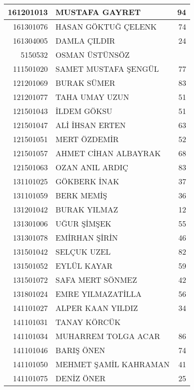 \documentclass[12pt]{article}
\begin{document}
\begin{longtable}{||r||l||r||}
    \midrule
    161201013 & MUSTAFA GAYRET & 94 \\
    \midrule
    161301076 & HASAN GÖKTUĞ ÇELENK & \cellcolor[rgb]{ 1,  1,  0} 74 \\
    \midrule
    161304005 & DAMLA ÇILDIR & 24 \\
    \midrule
    5150532 & OSMAN ÜSTÜNSÖZ &  \\
    \midrule
    111501020 & SAMET MUSTAFA ŞENGÜL & \cellcolor[rgb]{ 1,  1,  0} 77 \\
    \midrule
    121201069 & BURAK SÜMER & 83 \\
    \midrule
    121201077 & TAHA UMAY UZUN & 51 \\
    \midrule
    121501043 & İLDEM GÖKSU & 51 \\
    \midrule
    121501047 & ALİ İHSAN ERTEN & 63 \\
    \midrule
    121501051 & MERT ÖZDEMİR & 52 \\
    \midrule
    121501057 & AHMET CİHAN ALBAYRAK & \cellcolor[rgb]{ 1,  1,  0} 68 \\
    \midrule
    121501063 & OZAN ANIL ARDIÇ & \cellcolor[rgb]{ 1,  1,  0} 83 \\
    \midrule
    131101025 & GÖKBERK İNAK & 37 \\
    \midrule
    131101059 & BERK MEMİŞ & 36 \\
    \midrule
    131201042 & BURAK YILMAZ & 12 \\
    \midrule
    131301006 & UĞUR ŞİMŞEK & 55 \\
    \midrule
    131301078 & EMİRHAN ŞİRİN & 46 \\
    \midrule
    131501042 & SELÇUK UZEL & 82 \\
    \midrule
    131501052 & EYLÜL KAYAR & 59 \\
    \midrule
    131501072 & SAFA MERT SÖNMEZ & 42 \\
    \midrule
    131801024 & EMRE YILMAZATİLLA & 56 \\
    \midrule
    141101027 & ALPER KAAN YILDIZ & 34 \\
    \midrule
    141101031 & TANAY KÖRCÜK &  \\
    \midrule
    141101034 & MUHARREM TOLGA ACAR & 86 \\
    \midrule
    141101046 & BARIŞ ÖNEN & 74 \\
    \midrule
    141101050 & MEHMET ŞAMİL KAHRAMAN & 41 \\
    \midrule
    141101075 & DENİZ ÖNER & 25 \\
    \midrule

\end{longtable}
\end{document}
